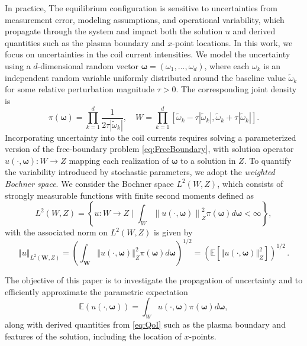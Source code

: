 In practice, The equilibrium configuration is sensitive to uncertainties from measurement error, modeling assumptions, and operational variability, which propagate through the system and impact both the solution $u$ and derived quantities such as the plasma boundary and $x$-point locations. In this work, we focus on uncertainties in the coil current intensities. We model the uncertainty using a $d$-dimensional random vector $\boldsymbol{\omega} = (\omega_1, \ldots, \omega_d)$, where each $\omega_k$ is an independent random variable uniformly distributed around the baseline value $\widetilde{\omega}_k$ for some relative perturbation magnitude $\tau > 0$. The corresponding joint density is
%
\[
\pi \left(\boldsymbol{\omega}\right)=\prod_{k=1}^{d} \frac{1}{2\tau |\widetilde{\omega}_k|},\quad W=\prod_{k=1}^{d}\left[\widetilde{\omega}_k-\tau \left\vert \widetilde{\omega}_k\right\vert,\widetilde{\omega}_k+\tau \left\vert \widetilde{\omega}_k \right\vert\right].
\]
%
Incorporating uncertainty into the coil currents requires solving a parameterized version of the free-boundary problem \eqref{eq:FreeBoundary}, with solution operator $u(\cdot,\boldsymbol{\omega}) : W \to Z$ mapping each realization of $\boldsymbol{\omega}$ to a solution in $Z$. To quantify the variability introduced by stochastic parameters, we adopt the {\it weighted Bochner space}. We consider the Bochner space $L^2(W,Z)$, which consists of strongly measurable functions with finite second moments defined as
%
\[
L^2(W,Z) = \left\{u:W\rightarrow Z\; \bigg\vert \;\int_{W}\left\|u(\cdot,\boldsymbol{\omega})\right\|_{Z}^2\pi(\boldsymbol{\omega})d\boldsymbol{\omega}<\infty\right\},
\]
%
with the associated norm on $L^2(W,Z)$ is given by
%
\[
\left\Vert u \right\Vert_{L^2(\boldsymbol W,Z)} =
    \left(\int_{\boldsymbol W} \left\Vert u(\cdot,\boldsymbol{\omega})  \right\Vert_{Z}^2 \pi(\boldsymbol{\omega})d\boldsymbol{\omega} \right)^{1/2} = \left(\mathbb{E}\left[\left\Vert u(\cdot,\boldsymbol{\omega})  \right\Vert_{Z}^2\right]\right)^{1/2}\,. 
\]
%

The objective of this paper is to investigate the propagation of uncertainty and to efficiently approximate the parametric expectation
%
 \begin{equation}
 \label{eq:QoI}
      \mathbb{E}\left(u(\cdot,\boldsymbol \omega)\right)=\int_W u(\cdot,\boldsymbol{\omega})\pi(\boldsymbol\omega)d\boldsymbol{\omega},
 \end{equation}
%
along with derived quantities from \eqref{eq:QoI} such as the plasma boundary and features of the solution, including the location of $x$-points.








